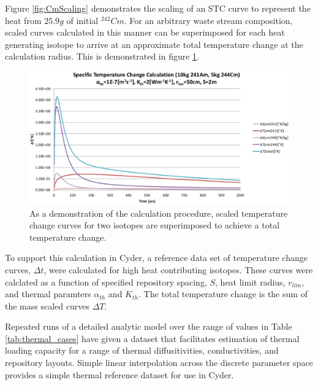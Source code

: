Figure \ref{fig:CmScaling} demonstrates the scaling of an STC curve to represent 
the heat from $25.9g$ of initial $^{242}Cm$. For an arbitrary waste stream 
composition, scaled curves calculated in this manner can be superimposed for 
each heat generating isotope to arrive at an approximate total temperature 
change at the calculation radius. This is demonstrated in figure 
\ref{fig:fakeArbitraryWF}.

\begin{figure}[htp!]
\begin{center}
\includegraphics[width=\columnwidth]{images/fakeArbitraryWF.eps}
\end{center}
\caption{As a demonstration of the calculation procedure, scaled temperature change 
  curves for two isotopes are superimposed to achieve a total temperature 
change.}
\label{fig:fakeArbitraryWF}
\end{figure}

To support this calculation in Cyder, a reference data set of temperature change 
curves, $\Delta t$, were calculated for high heat contributing isotopes. These 
curves were calclated as a function of specified repository spacing, $S$, heat limit radius, $r_{lim}$, and thermal paramters $\alpha_{th}$ and $K_{th}$. The total temperature change is the sum of the mass scaled curves $\Delta T$.



Repeated runs of a detailed analytic model over the range of values in Table 
\ref{tab:thermal_cases} have given a dataset that 
facilitates estimation of thermal loading capacity for a range of thermal 
diffusitivities, conductivities, and repository layouts. Simple linear 
interpolation across the discrete parameter space provides a simple thermal 
reference dataset for use in Cyder.
